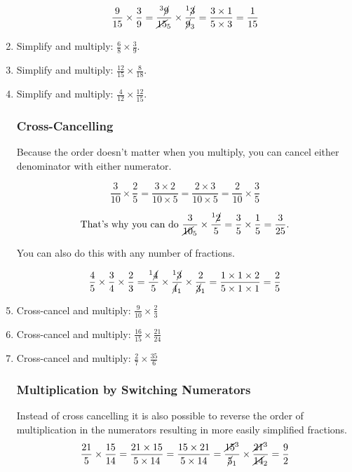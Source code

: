 \documentclass[14pt]{article}
\begin{document}
\begin{enumerate}
$$\frac{9}{15} \times \frac{3}{9} =
\frac{{^3\cancel{9}}}{{\cancel{15}_5}} \times \frac{{^1\cancel{3}}}{{\cancel{9}_3}} = \frac{3\times1}{5\times3} = \frac{1}{15}$$

\item Simplify and multiply: $\frac{6}{8}\times\frac{3}{9}.$
\item Simplify and multiply: $\frac{12}{15}\times\frac{8}{18}.$
\item Simplify and multiply: $\frac{4}{12}\times\frac{12}{15}.$

\subsubsection*{Cross-Cancelling}
Because the order doesn't matter when you multiply, you can cancel either denominator with either numerator.

$$\frac{3}{10} \times \frac{2}{5} = \frac{{3 \times 2}}{{10 \times 5}} = \frac{{2 \times 3}}{{10 \times 5}} = \frac{2}{10} \times \frac{3}{5}$$

$$\text{That's why you can do }\frac{3}{{\cancel{10}_5}} \times \frac{{^1\cancel{2}}}{5} = \frac{3}{5} \times \frac{1}{5} = \frac{3}{25}\text{.}$$

You can also do this with any number of fractions.

$$\frac{4}{5} \times \frac{3}{4} \times \frac{2}{3} = \frac{{^1\cancel{4}}}{5} \times \frac{{^1\cancel{3}}}{{\cancel{4}_1}} \times \frac{2}{{\cancel{3}_1}} = \frac{1 \times 1 \times2}{5 \times 1 \times 1} = \frac{2}{5}$$

\item Cross-cancel and multiply: $\frac{9}{10} \times \frac{2}{3}$
\item Cross-cancel and multiply: $\frac{16}{15} \times \frac{21}{24}$
\item Cross-cancel and multiply: $\frac{2}{7} \times \frac{35}{6}$

\subsubsection*{Multiplication by Switching Numerators}
Instead of cross cancelling it is also possible to reverse the order of multiplication in the numerators resulting in more easily simplified fractions.
$$\frac{21}{5} \times \frac{15}{14}
 = \frac{21 \times 15}{5 \times 14}
= \frac{15 \times 21}{5 \times 14}
= \frac{\cancel{15}^3}{\cancel{5}_1} \times \frac{\cancel{21}^3}{\cancel{14}_2} = \frac{9}{2}$$


\end{enumerate}
\end{document}
